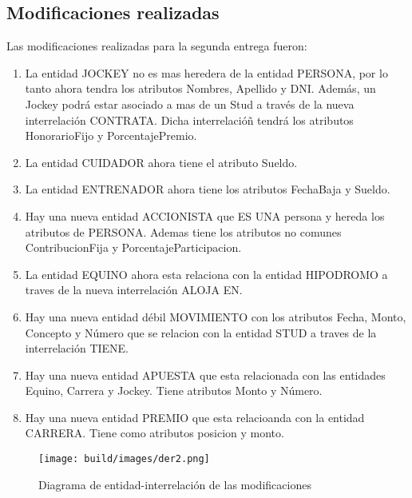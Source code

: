 \documentclass[a4paper,11pt]{article}
\begin{document}
\subsection{Modificaciones realizadas}

Las modificaciones realizadas para la segunda entrega fueron:

\begin{enumerate}

  \item La entidad JOCKEY no es mas heredera de la entidad PERSONA, por lo tanto
	ahora tendra los atributos Nombres, Apellido y DNI. Además, un Jockey podrá
	estar asociado a mas de un Stud a través de la nueva interrelación CONTRATA.
  Dicha interrelacióñ tendrá los atributos HonorarioFijo y PorcentajePremio. 

  \item La entidad CUIDADOR ahora tiene el atributo Sueldo.

  \item La entidad ENTRENADOR ahora tiene los atributos FechaBaja y Sueldo. 

  \item Hay una nueva entidad ACCIONISTA que ES UNA persona y hereda los atributos
	de PERSONA. Ademas tiene los atributos no comunes ContribucionFija y 
  PorcentajeParticipacion.
  
  \item La entidad EQUINO ahora esta relaciona con la entidad HIPODROMO a traves
    de la nueva interrelación ALOJA EN. 

  \item Hay una nueva entidad débil MOVIMIENTO con los atributos Fecha, Monto,
    Concepto y Número que se relacion con la entidad STUD a traves de la interrelación
    TIENE.

  \item Hay una nueva entidad APUESTA que esta relacionada con las entidades Equino, 
    Carrera y Jockey. Tiene atributos Monto y Número. 

  \item Hay una nueva entidad PREMIO que esta relacioanda con la entidad
    CARRERA. Tiene como atributos posicion y monto.

\end{enumerate}

\begin{figure}[h!t]
  \centering
  \texttt{[image: build/images/der2.png]}
  \caption{Diagrama de entidad-interrelación de las modificaciones} \label{fig:der2}
\end{figure}
\end{document}
